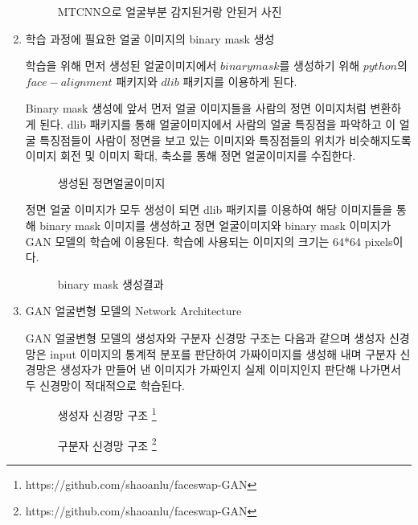 \documentclass{oblivoir}
\begin{document}
\begin{enumerate}
    \begin{figure}[h!]%
    \centering
    \caption{MTCNN으로 얼굴부분 감지된거랑 안된거 사진}
    \end{figure}


    \item 학습 과정에 필요한 얼굴 이미지의 binary mask 생성

    학습을 위해 먼저 생성된 얼굴이미지에서 $binary mask$를 생성하기 위해 $python$의 $face-alignment$ 패키지와 $dlib$ 패키지를 이용하게 된다.

    Binary mask 생성에 앞서 먼저 얼굴 이미지들을 사람의 정면 이미지처럼 변환하게 된다. dlib 패키지를 통해 얼굴이미지에서 사람의 얼굴 특징점을 파악하고 이 얼굴 특징점들이 사람이 정면을 보고 있는 이미지와 특징점들의 위치가 비슷해지도록 이미지 회전 및 이미지 확대, 축소를 통해 정면 얼굴이미지를 수집한다.
    \begin{figure}[h!] %
    \centering
    \caption{생성된 정면얼굴이미지}
    \end{figure}



    정면 얼굴 이미지가 모두 생성이 되면 dlib 패키지를 이용하여 해당 이미지들을 통해 binary mask 이미지를 생성하고 정면 얼굴이미지와 binary mask 이미지가 GAN 모델의 학습에 이용된다. 학습에 사용되는 이미지의 크기는 64*64 pixels이다. 
    \begin{figure}[h!]%
    \centering
    \caption{binary mask 생성결과}
    \end{figure}


    \item GAN 얼굴변형 모델의 Network Architecture

    GAN 얼굴변형 모델의 생성자와 구분자 신경망 구조는 다음과 같으며 생성자 신경망은 input 이미지의 통계적 분포를 판단하여 가짜이미지를 생성해 내며 구분자 신경망은 생성자가 만들어 낸 이미지가 가짜인지 실제 이미지인지 판단해 나가면서 두 신경망이 적대적으로 학습된다.

    \begin{figure}[h!]
    \centering
    \caption{생성자 신경망 구조 \protect\footnote{https://github.com/shaoanlu/faceswap-GAN}}
    \end{figure}


    \begin{figure}[h!]
    \centering
    \caption{구분자 신경망 구조 \protect\footnote{https://github.com/shaoanlu/faceswap-GAN}}
    \end{figure}


\end{enumerate}
\end{document}

